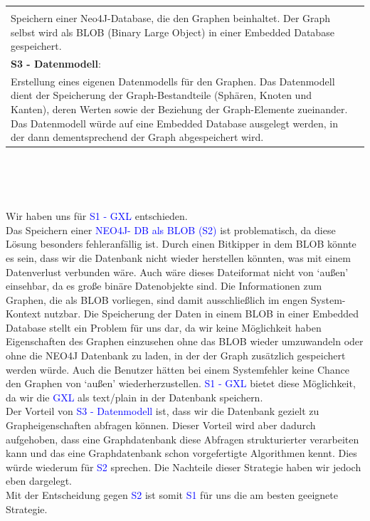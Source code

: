 \documentclass[enabledeprecatedfontcommands,fontsize=11pt,paper=a4,twoside]{scrartcl}
\newcounter{one}
\newcommand{\cb}[1]{{\textcolor{blue}{#1}}}
\begin{document}
\begin{tabular} {|p{8cm} p{8cm}|}
{{			\textbf{S2 - BLOB NEO4J}: \\
			Speichern einer Neo4J-Database, die den Graphen beinhaltet. Der Graph selbst wird als BLOB (Binary Large Object) in einer Embedded Database gespeichert. \\
			\textbf{S3 - Datenmodell}: \\
			Erstellung eines eigenen Datenmodells für den Graphen. Das Datenmodell dient der Speicherung der Graph-Bestandteile (Sphären, Knoten und Kanten), deren Werten sowie der Beziehung der Graph-Elemente zueinander. Das Datenmodell würde auf eine Embedded Database ausgelegt werden, in der dann dementsprechend der Graph abgespeichert wird.
	} }\\ [11ex] \hline
\end{tabular}\\ \\ \\
\begin{onehalfspace}
	Wir haben uns für \cb{S1 - GXL} entschieden. \\ 
	Das Speichern einer \cb{NEO4J- DB als BLOB (S2)} ist problematisch, da diese Lösung besonders fehleranfällig ist. Durch einen Bitkipper in dem BLOB könnte es sein, dass wir die Datenbank nicht wieder herstellen könnten, was mit einem Datenverlust verbunden wäre. Auch wäre dieses Dateiformat nicht von ‘außen’ einsehbar, da es große binäre Datenobjekte sind. Die Informationen zum Graphen, die als BLOB vorliegen, sind damit ausschließlich im engen System-Kontext nutzbar. Die Speicherung der Daten in einem BLOB in einer Embedded Database stellt ein Problem für uns dar, da wir keine Möglichkeit haben Eigenschaften des Graphen einzusehen ohne das BLOB wieder umzuwandeln oder ohne die NEO4J Datenbank zu laden, in der der Graph zusätzlich gespeichert werden würde. Auch die Benutzer hätten bei einem Systemfehler keine Chance den Graphen von ‘außen’ wiederherzustellen. \cb{S1 - GXL} bietet diese Möglichkeit, da wir die \cb{GXL} als text/plain in der Datenbank speichern. \\ 
	Der Vorteil von \cb{S3 - Datenmodell} ist, dass wir die Datenbank gezielt zu Grapheigenschaften abfragen können. Dieser Vorteil wird aber dadurch aufgehoben, dass eine Graphdatenbank diese Abfragen strukturierter verarbeiten kann und das eine Graphdatenbank schon vorgefertigte Algorithmen kennt. Dies würde wiederum für \cb{S2} sprechen. Die Nachteile dieser Strategie haben wir jedoch eben dargelegt. \\
	Mit der Entscheidung gegen \cb{S2} ist somit \cb{S1} für uns die am besten geeignete Strategie.
\end{onehalfspace}
\end{document}
